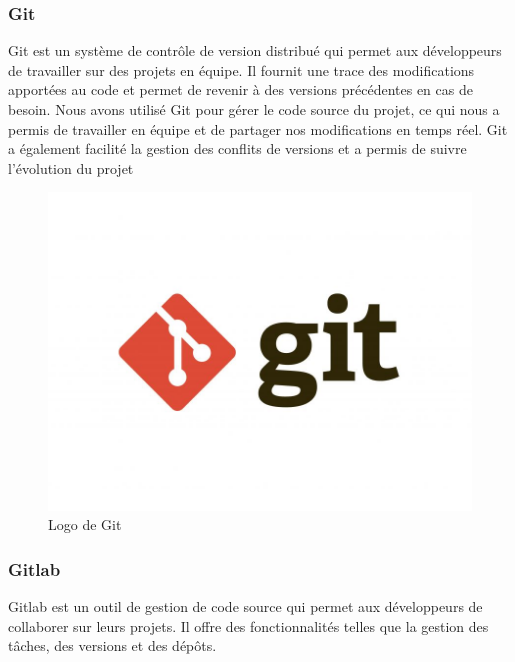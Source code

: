 \subsubsection{Git}
Git est un système de contrôle de version distribué qui permet aux développeurs de travailler
sur des projets en équipe. Il fournit une trace des modifications apportées au code
et permet de revenir à des versions précédentes en cas de besoin. Nous avons utilisé
Git pour gérer le code source du projet, ce qui nous a permis de travailler en
équipe et de partager nos modifications en temps réel. Git a également facilité
la gestion des conflits de versions et a permis de suivre l'évolution du projet
\begin{figure}[h]
    \centering
    \includegraphics[scale=0.3]{Images/git.jpg} %
    \caption{Logo de Git\cite{git}}
    \label{fig:git}
    \end{figure}

\subsubsection{Gitlab}
Gitlab est un outil de gestion de code source qui permet aux développeurs de collaborer sur leurs projets. Il offre des fonctionnalités telles que la gestion des tâches, des versions et des dépôts.

